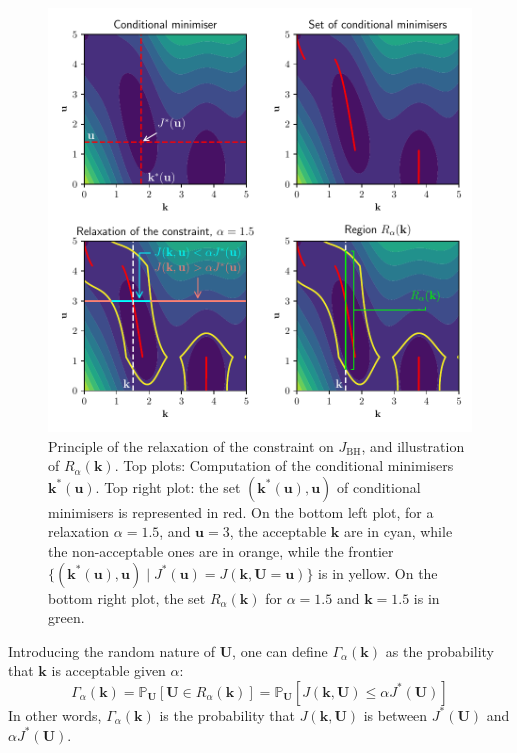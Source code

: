 \documentclass[preprint, 1p]{elsarticle}
\newcommand{\Prob}{\mathbb{P}}
\newcommand{\JBH}{J_{\mathrm{BH}}}
\newlength{\onehalfcolumn}
\begin{document}


\begin{figure}[!t]
\centering
\includegraphics[width=\onehalfcolumn]{Figures/FIG03.pdf}
\caption{Principle of the relaxation of the constraint on $\JBH$, and illustration of $R_\alpha(\mathbf{k})$. Top plots: Computation of the conditional minimisers $\mathbf{k}^*(\mathbf{u})$. Top right plot: the set $(\mathbf{k}^*(\mathbf{u}),\mathbf{u})$ of conditional minimisers is represented in red. On the bottom left plot, for a relaxation $\alpha=1.5$, and $\mathbf{u}=3$, the acceptable $\mathbf{k}$ are in cyan, while the non-acceptable ones are in orange, while the frontier $\{(\mathbf{k}^*(\mathbf{u}),\mathbf{u}) \mid J^*(\mathbf{u}) = J(\mathbf{k},\mathbf{U}=\mathbf{u})\}$ is in yellow. On the bottom right plot, the set $R_{\alpha}(\mathbf{k})$ for $\alpha=1.5$ and $\mathbf{k}=1.5$ is in green.}
\label{fig:relax_tuto}
\end{figure}

Introducing the random nature of $\mathbf{U}$, one can define $\Gamma_\alpha(\mathbf{k})$ as the probability that $\mathbf{k}$ is acceptable given $\alpha$:
\begin{equation}
  \label{eq:def_Gamma}
  \Gamma_\alpha(\mathbf{k}) = \Prob_{\mathbf{U}}\left[\mathbf{U} \in R_\alpha(\mathbf{k})\right] = \Prob_{\mathbf{U}}\left[J(\mathbf{k},\mathbf{U}) \leq 
    \alpha J^*(\mathbf{U}) \right]
\end{equation}
In other words, $\Gamma_{\alpha}(\mathbf{k})$ is the probability that $J(\mathbf{k},\mathbf{U})$ is between 
$J^*(\mathbf{U})$ and 
$\alpha J^*(\mathbf{U})$.
\end{document}
